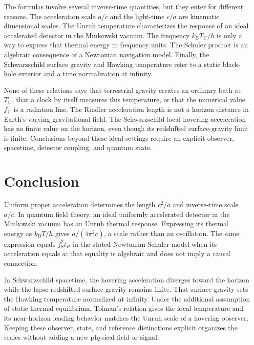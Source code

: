 \documentclass[12pt]{article}
\begin{document}
The formulas involve several inverse-time quantities, but they enter for different reasons. The acceleration scale $a/c$ and the light-time $c/a$ are kinematic dimensional scales. The Unruh temperature characterizes the response of an ideal accelerated detector in the Minkowski vacuum. The frequency $k_{\mathrm{B}}T_{\mathrm{U}}/h$ is only a way to express that thermal energy in frequency units. The Schuler product is an algebraic consequence of a Newtonian navigation model. Finally, the Schwarzschild surface gravity and Hawking temperature refer to a static black-hole exterior and a time normalization at infinity.

None of these relations says that terrestrial gravity creates an ordinary bath at $T_{\mathrm{U}}$, that a clock by itself measures this temperature, or that the numerical value $f_{\mathrm{U}}$ is a radiation line. The Rindler acceleration length is not a horizon distance in Earth's varying gravitational field. The Schwarzschild local hovering acceleration has no finite value on the horizon, even though its redshifted surface-gravity limit is finite. Conclusions beyond these ideal settings require an explicit observer, spacetime, detector coupling, and quantum state.

\section{Conclusion}

Uniform proper acceleration determines the length $c^2/a$ and inverse-time scale $a/c$. In quantum field theory, an ideal uniformly accelerated detector in the Minkowski vacuum has an Unruh thermal response. Expressing its thermal energy as $k_{\mathrm{B}}T/h$ gives $a/(4\pi^2c)$, a scale rather than an oscillation. The same expression equals $f_{\mathrm{S}}^2t_R$ in the stated Newtonian Schuler model when its acceleration equals $a$; that equality is algebraic and does not imply a causal connection.

In Schwarzschild spacetime, the hovering acceleration diverges toward the horizon while the lapse-redshifted surface gravity remains finite. That surface gravity sets the Hawking temperature normalized at infinity. Under the additional assumption of static thermal equilibrium, Tolman's relation gives the local temperature and its near-horizon leading behavior matches the Unruh scale of a hovering observer. Keeping these observer, state, and reference distinctions explicit organizes the scales without adding a new physical field or signal.
\end{document}
